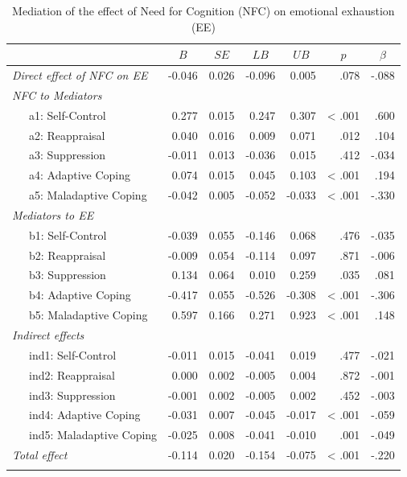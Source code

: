 \documentclass[
  man]{apa6}
\begin{document}
\begin{table}[tbp]

\begin{center}
\begin{threeparttable}

\caption{\label{tab:RQ5}Mediation of the effect of Need for Cognition (NFC) on emotional exhaustion (EE)}

\footnotesize{

\begin{tabular}{lrrrrrr}
\toprule
 & \multicolumn{1}{c}{$B$} & \multicolumn{1}{c}{$SE$} & \multicolumn{1}{c}{$LB$} & \multicolumn{1}{c}{$UB$} & \multicolumn{1}{c}{$p$} & \multicolumn{1}{c}{$\beta$}\\
\midrule
\textit{Direct effect of NFC on EE} & -0.046 & 0.026 & -0.096 & 0.005 & .078 & -.088\\ \midrule
\textit{NFC to Mediators} &  &  &  &  &  & \\
\ \ \ a1: Self-Control & 0.277 & 0.015 & 0.247 & 0.307 & < .001 & .600\\
\ \ \ a2: Reappraisal & 0.040 & 0.016 & 0.009 & 0.071 & .012 & .104\\
\ \ \ a3: Suppression & -0.011 & 0.013 & -0.036 & 0.015 & .412 & -.034\\
\ \ \ a4: Adaptive Coping & 0.074 & 0.015 & 0.045 & 0.103 & < .001 & .194\\
\ \ \ a5: Maladaptive Coping & -0.042 & 0.005 & -0.052 & -0.033 & < .001 & -.330\\ \midrule
\textit{Mediators to EE} &  &  &  &  &  & \\
\ \ \ b1: Self-Control & -0.039 & 0.055 & -0.146 & 0.068 & .476 & -.035\\
\ \ \ b2: Reappraisal & -0.009 & 0.054 & -0.114 & 0.097 & .871 & -.006\\
\ \ \ b3: Suppression & 0.134 & 0.064 & 0.010 & 0.259 & .035 & .081\\
\ \ \ b4: Adaptive Coping & -0.417 & 0.055 & -0.526 & -0.308 & < .001 & -.306\\
\ \ \ b5: Maladaptive Coping & 0.597 & 0.166 & 0.271 & 0.923 & < .001 & .148\\ \midrule
\textit{Indirect effects} &  &  &  &  &  & \\
\ \ \ ind1: Self-Control & -0.011 & 0.015 & -0.041 & 0.019 & .477 & -.021\\
\ \ \ ind2: Reappraisal & 0.000 & 0.002 & -0.005 & 0.004 & .872 & -.001\\
\ \ \ ind3: Suppression & -0.001 & 0.002 & -0.005 & 0.002 & .452 & -.003\\
\ \ \ ind4: Adaptive Coping & -0.031 & 0.007 & -0.045 & -0.017 & < .001 & -.059\\
\ \ \ ind5: Maladaptive Coping & -0.025 & 0.008 & -0.041 & -0.010 & .001 & -.049\\ \midrule
\textit{Total effect} & -0.114 & 0.020 & -0.154 & -0.075 & < .001 & -.220\\
\bottomrule
\addlinespace
\end{tabular}

}
\end{threeparttable}
\end{center}
\end{table}
\end{document}
